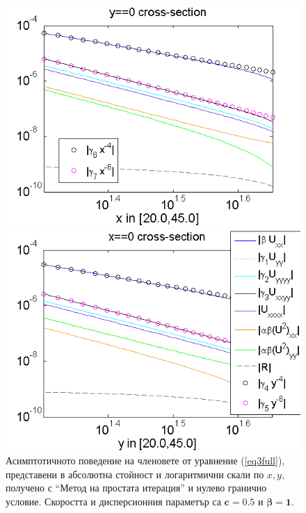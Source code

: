 \documentclass{article}
\newcommand{\rf}[1]{(\ref{#1})}
\theoremstyle{remark}
\begin{document}
\begin{figure}[ht]
	\begin{minipage}[b]{0.95\linewidth}
		\raggedleft
		\includegraphics[width=\linewidth]{AssymptForEachTerm/bt1_c010_090/ChristovIC_AlongX_50_ZB2_bt1_c050_h020_O(h^6).png}
	\end{minipage}
	\begin{minipage}[b]{0.95\linewidth}
		 \raggedright
		\includegraphics[width=\linewidth]{AssymptForEachTerm/bt1_c010_090/ChristovIC_AlongY_50_ZB2_bt1_c050_h020_O(h^6).png}
	\end{minipage}
	\caption{Асимптотичното поведение на членовете от уравнение \rf{eq3full}, представени в абсолютна стойност и логаритмични скали по $x,y$, получено с ``Метод на простата итерация'' и нулево гранично условие. Скоростта и дисперсионния параметър са $\boldsymbol{c=0.5}$ и $\boldsymbol{\beta = 1}$. }
	\label{fig:assympt_beta1c05}
\end{figure}
\FloatBarrier
\end{document}
